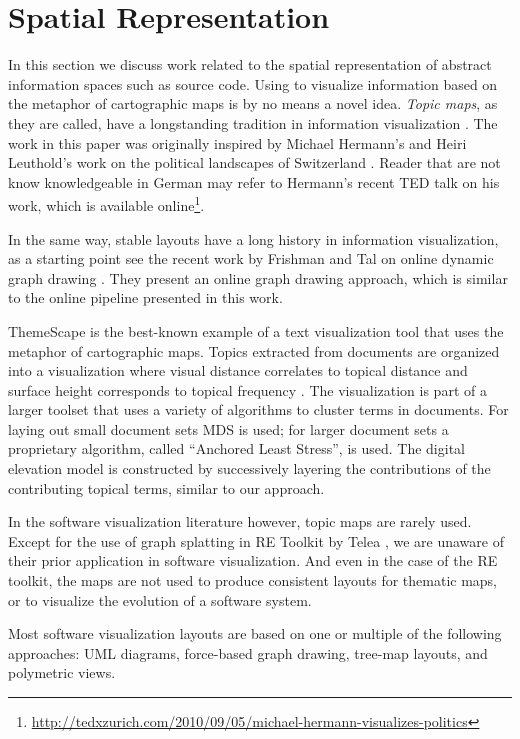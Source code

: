 \section{Spatial Representation}

In this section we discuss work related to the spatial representation of abstract information spaces such as source code. Using \mds to visualize information based on the metaphor of cartographic maps is by no means a novel idea. \emph{Topic maps}, as they are called, have a longstanding tradition in information visualization \cite{Ware04a}. The work in this paper was originally inspired by Michael Hermann's and Heiri Leuthold's work on the political landscapes of Switzerland \cite{Herm03a}. Reader that are not know knowledgeable in German may refer to Hermann's recent TED talk on his work, which is available online\footnote{\url{http://tedxzurich.com/2010/09/05/michael-hermann-visualizes-politics}}.

In the same way, stable layouts have a long history in information visualization, as a starting point see \eg the recent work by Frishman and Tal on online dynamic graph drawing \cite{Fris08a}. They present an online graph drawing approach, which is similar to the online pipeline presented in this work.

ThemeScape is the best-known example of a text visualization tool that uses the metaphor of cartographic maps. 
Topics extracted from documents are organized into a visualization where visual distance correlates to topical distance and surface height corresponds to topical frequency \cite{Wise95b}. The visualization is part of a larger toolset that uses a variety of algorithms to cluster terms in documents. For laying out small document sets MDS is used; for larger document sets a proprietary algorithm, called ``Anchored Least Stress'', is used. The digital elevation model is constructed by successively layering the contributions of the contributing topical terms, similar to our approach.

In the software visualization literature however, topic maps are rarely used.
Except for the use of graph splatting in RE Toolkit by Telea \etal \cite{Tele03a}, we are unaware of their prior application in software visualization. And even in the case of the RE toolkit, the maps are not used to produce consistent layouts for thematic maps, or to visualize the evolution of a software system. 

Most software visualization layouts are based on one or multiple of the following approaches: UML diagrams, force-based graph drawing, tree-map layouts, and polymetric views.


